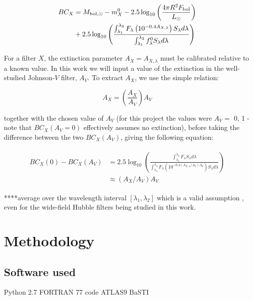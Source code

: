 \documentclass[a4paper, 11pt, oneside]{LJMU_Astro_Thesis}  %
\begin{document}
\begin{align}
\begin{split}
BC_{X} &= M_{\textnormal{bol},\odot} - m_{X}^{0} - 2.5 \log_{10} \left( \frac{4\pi R^{2}F_{\textnormal{bol}}}{L_{\odot}} \right) \\
&+ 2.5 \log_{10} \left( \frac{\int_{\lambda_{1}}^{\lambda_{2}} F_{\lambda} \left( 10^{-0.4 A_{X,\lambda}} \right) S_{\lambda} d\lambda}{\int_{\lambda_{1}}^{\lambda_{2}} f_{\lambda}^{0} S_{\lambda} d\lambda} \right)
\label{BC_extinc}
\end{split}
\end{align}

For a filter $X$, the extinction parameter $A_{X} = A_{X,\lambda}$ must be calibrated relative to a known value. In this work we will input a value of the extinction in the well-studied Johnson-$V$ filter, $A_{V}$. To extract $A_{X}$, we use the simple relation:

\begin{equation}
A_{X} = \left( \frac{A_{X}}{A_{V}} \right) A_{V}
\label{ratio_eq}
\end{equation}

together with the chosen value of $A_{V}$ (for this project the values were $A_{V} =$ 0, 1 - note that $BC_{X}(A_{V}=0)$ effectively assumes no extinction), before taking the difference between the two $BC_{X}(A_{V})$, giving the following equation:

\begin{align}
\begin{split}
BC_{X}(0) - BC_{X}(A_{V}) &= 2.5 \log_{10} \left( \frac{\int_{\lambda_{1}}^{\lambda_{2}} F_{\lambda}  S_{\lambda} d\lambda}{\int_{\lambda_{1}}^{\lambda_{2}} F_{\lambda}\left( 10^{-0.4 \left(A_{X,\lambda}/A_{V}\right)A_{V}} \right) S_{\lambda} d\lambda} \right)
\\ &\approx \left(A_{X}/A_{V}\right)A_{V}
\label{BCs_diff}
\end{split}
\end{align}

****average over the wavelength interval $[\lambda_{1},\lambda_{2}]$ which is a valid assumption \citep{2008PASP..120..583G}, even for the wide-field Hubble filters being studied in this work.

\section{Methodology}
\subsection{Software used}
Python 2.7
FORTRAN 77 code
ATLAS9
BaSTI
\end{document}
